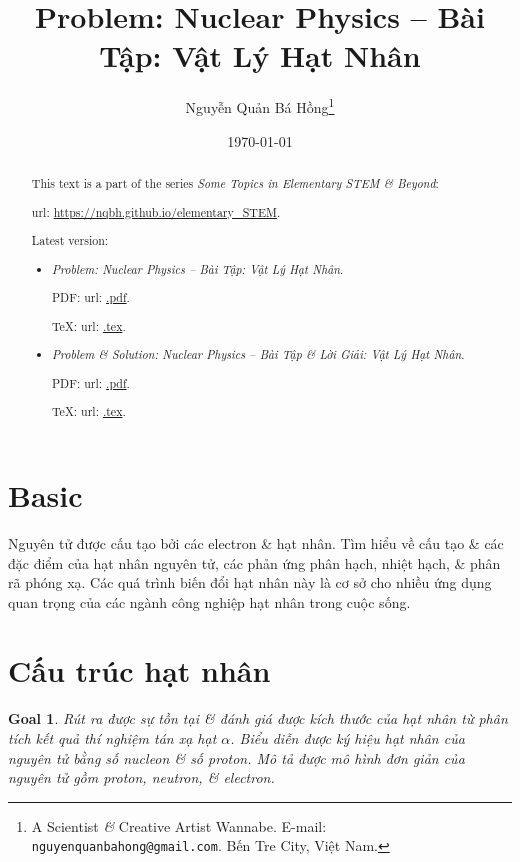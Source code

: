 \documentclass{article}
\title{Problem: Nuclear Physics -- Bài Tập: Vật Lý Hạt Nhân}
\author{Nguyễn Quản Bá Hồng\footnote{A Scientist {\it\&} Creative Artist Wannabe. E-mail: {\tt nguyenquanbahong@gmail.com}. Bến Tre City, Việt Nam.}}
\date{\today}
\newtheorem{goal}{Goal}
\begin{document}
\maketitle
\begin{abstract}
	This text is a part of the series {\it Some Topics in Elementary STEM \& Beyond}:
	
	{\sc url}: \url{https://nqbh.github.io/elementary_STEM}.
	
	Latest version:
	\begin{itemize}
		\item {\it Problem: Nuclear Physics -- Bài Tập: Vật Lý Hạt Nhân}.
		
		PDF: {\sc url}: \url{.pdf}.
		
		\TeX: {\sc url}: \url{.tex}.
		\item {\it Problem \& Solution: Nuclear Physics -- Bài Tập \& Lời Giải: Vật Lý Hạt Nhân}.
		
		PDF: {\sc url}: \url{.pdf}.
		
		\TeX: {\sc url}: \url{.tex}.
	\end{itemize}
\end{abstract}
\tableofcontents


\section{Basic}
Nguyên tử được cấu tạo bởi các electron \& hạt nhân. Tìm hiểu về cấu tạo \& các đặc điểm của hạt nhân nguyên tử, các phản ứng phân hạch, nhiệt hạch, \& phân rã phóng xạ. Các quá trình biến đổi hạt nhân này là cơ sở cho nhiều ứng dụng quan trọng của các ngành công nghiệp hạt nhân trong cuộc sống.


\section{Cấu trúc hạt nhân}

\begin{goal}
	Rút ra được sự tồn tại \& đánh giá được kích thước của hạt nhân từ phân tích kết quả thí nghiệm tán xạ hạt $\alpha$. Biểu diễn được ký hiệu hạt nhân của nguyên tử bằng số nucleon \& số proton. Mô tả được mô hình đơn giản của nguyên tử gồm proton, neutron, \& electron.
\end{goal}
\end{document}
